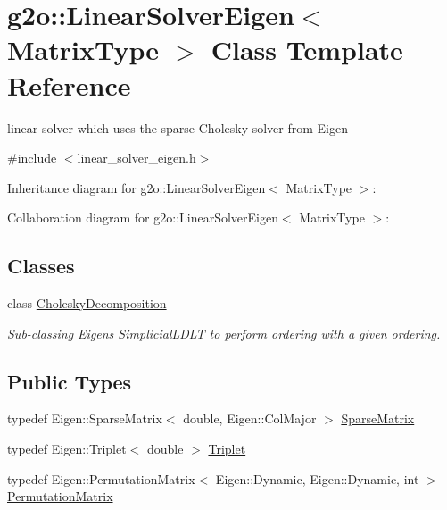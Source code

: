 \hypertarget{classg2o_1_1LinearSolverEigen}{}\section{g2o\+:\+:Linear\+Solver\+Eigen$<$ Matrix\+Type $>$ Class Template Reference}
\label{classg2o_1_1LinearSolverEigen}


linear solver which uses the sparse Cholesky solver from Eigen  




{\ttfamily \#include $<$linear\+\_\+solver\+\_\+eigen.\+h$>$}



Inheritance diagram for g2o\+:\+:Linear\+Solver\+Eigen$<$ Matrix\+Type $>$\+:


Collaboration diagram for g2o\+:\+:Linear\+Solver\+Eigen$<$ Matrix\+Type $>$\+:
\subsection*{Classes}
\begin{DoxyCompactItemize}
\item 
class \hyperlink{classg2o_1_1LinearSolverEigen_1_1CholeskyDecomposition}{Cholesky\+Decomposition}
\begin{DoxyCompactList}\small\item\em Sub-\/classing Eigen\textquotesingle{}s Simplicial\+L\+D\+LT to perform ordering with a given ordering. \end{DoxyCompactList}\end{DoxyCompactItemize}
\subsection*{Public Types}
\begin{DoxyCompactItemize}
\item 
typedef Eigen\+::\+Sparse\+Matrix$<$ double, Eigen\+::\+Col\+Major $>$ \hyperlink{classg2o_1_1LinearSolverEigen_aeb7e2400bed3a249b5f29ce7cc00cd33}{Sparse\+Matrix}
\item 
typedef Eigen\+::\+Triplet$<$ double $>$ \hyperlink{classg2o_1_1LinearSolverEigen_a602c24e05d2f46022aa1827fdbc45638}{Triplet}
\item 
typedef Eigen\+::\+Permutation\+Matrix$<$ Eigen\+::\+Dynamic, Eigen\+::\+Dynamic, int $>$ \hyperlink{classg2o_1_1LinearSolverEigen_a86afb924e2b1d3ebd9b9d4a318eded44}{Permutation\+Matrix}
\end{DoxyCompactItemize}
